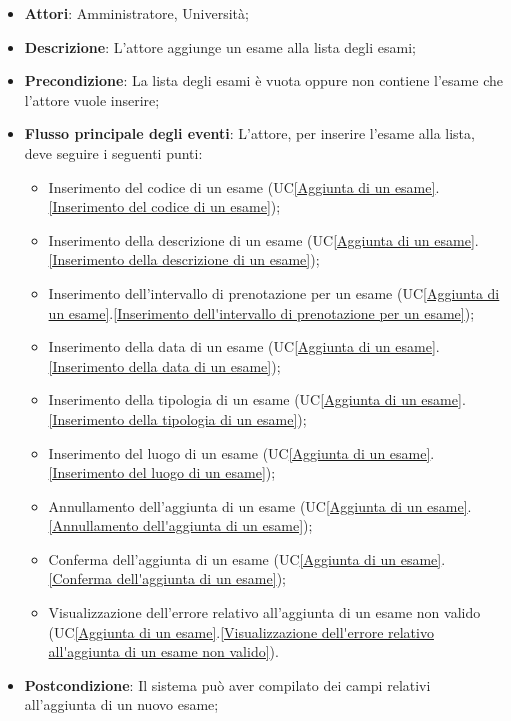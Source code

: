 \begin{itemize}
	\item \textbf{Attori}: Amministratore, Università;
	\item \textbf{Descrizione}: L'attore aggiunge un esame alla lista degli esami;
	
	\item \textbf{Precondizione}: La lista degli esami è vuota oppure non contiene l'esame che l'attore vuole inserire;
	
	\item \textbf{Flusso principale degli eventi}: L'attore, per inserire l'esame alla lista, deve seguire i seguenti punti:
	
	\begin{itemize}
		\item Inserimento del codice di un esame (UC\ref{Aggiunta di un esame}.\ref{Inserimento del codice di un esame});
		\item Inserimento della descrizione di un esame (UC\ref{Aggiunta di un esame}.\ref{Inserimento della descrizione di un esame});
		\item Inserimento dell'intervallo di prenotazione per un esame (UC\ref{Aggiunta di un esame}.\ref{Inserimento dell'intervallo di prenotazione per un esame});
		\item Inserimento della data di un esame (UC\ref{Aggiunta di un esame}.\ref{Inserimento della data di un esame});
		\item Inserimento della tipologia di un esame (UC\ref{Aggiunta di un esame}.\ref{Inserimento della tipologia di un esame});
		\item Inserimento del luogo di un esame (UC\ref{Aggiunta di un esame}.\ref{Inserimento del luogo di un esame});
		\item Annullamento dell'aggiunta di un esame (UC\ref{Aggiunta di un esame}.\ref{Annullamento dell'aggiunta di un esame});
		\item Conferma dell'aggiunta di un esame (UC\ref{Aggiunta di un esame}.\ref{Conferma dell'aggiunta di un esame});
		\item Visualizzazione dell'errore relativo all'aggiunta di un esame non valido (UC\ref{Aggiunta di un esame}.\ref{Visualizzazione dell'errore relativo all'aggiunta di un esame non valido}).
	\end{itemize}
	\item \textbf{Postcondizione}: Il sistema può aver compilato dei campi relativi all'aggiunta di un nuovo esame;
	
\end{itemize}

